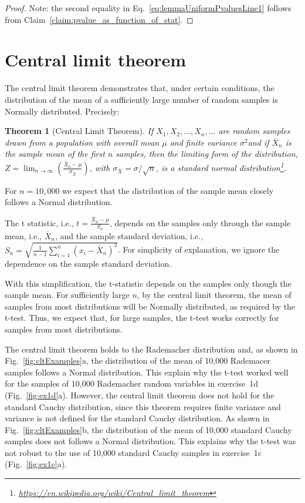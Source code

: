 \documentclass[12pt]{article}
\newtheorem{theorem}{Theorem}
\begin{document}
\begin{appendices}
\begin{proof}
Note: the second equality in Eq.~\ref{eq:lemmaUniformPvaluesLine1} follows
from Claim~\ref{claim:pvalue_as_function_of_stat}.

\end{proof}

\section{Central limit theorem}
\label{sec:clt}

The central limit theorem demonstrates that, under certain conditions, the
distribution of the mean of a sufficiently large number of random samples
is Normally distributed. Precisely:

\begin{theorem}[Central Limit Theorem]

If $X_{1},X_{2},\dots ,X_{n},\dots$ are random samples drawn from a population
    with overall mean $\mu$ and finite variance $\sigma^{2}$and if $\bar
    {X}_{n}$ is the sample mean of the first $n$ samples, then the limiting
    form of the distribution,
    $Z=\lim_{n\to\infty}\left(\frac{\bar{X}_{n}-\mu}{\sigma_{\bar{X}}}\right)$,
    with $\sigma _{\bar{X}}=\sigma/\sqrt{n}$, is a standard normal
    distribution\footnote{\url{https://en.wikipedia.org/wiki/Central_limit_theorem}}.

\end{theorem}

For $n=10,000$ we expect that the distribution of the sample mean closely
follows a Normal distribution.

The t statistic, i.e., $t=\frac{\bar{X}_n-\mu}{S_n}$, depends on the samples
only through the sample mean, i.e., $\bar{X}_n$, and the sample standard
deviation, i.e.,
$S_n=\sqrt{\frac{1}{n-1}\sum_{i=1}^n\left(x_i-\bar{X}_n\right)^2}$.  For
simplicity of explanation, we ignore the dependence on the sample standard
deviation.

With this simplification, the t-statistic depends on the samples only though
the sample mean. For sufficiently large $n$, by the central limit theorem, the
mean of samples from most distributions will be Normally distributed, as
required by the t-test. Thus, we expect that, for large samples, the t-test
works correctly for samples from most distributions.

The central limit theorem holds to the Rademacher distribution and, as shown in
Fig.~\ref{fig:cltExamples}a, the distribution of the mean of 10,000 Rademacer
samples follows a Normal distribution. This explain why the t-test worked well
for the samples of 10,000 Rademacher random variables in exercise~1d
(Fig.~\ref{fig:ex1d}a).
%
However, the central limit theorem does not hold for the standard Cauchy
distribution, since this theorem requires finite
variance and variance is not defined for the standard Cauchy distribution. As
shown in Fig.~\ref{fig:cltExamples}b, the distribution of the mean of 10,000
standard Cauchy samples does not follows a Normal distribution.
This explains why the t-test was not robust to the use of 10,000 standard
Cauchy samples in exercise~1c (Fig.~\ref{fig:ex1c}a).


\end{appendices}
\end{document}
